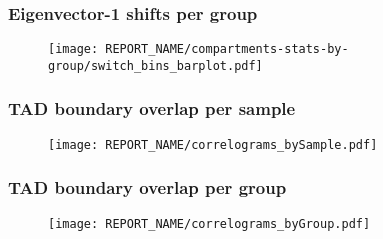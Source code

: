 \begin{frame}												%
\frametitle{Eigenvector-1 shifts per group}								%
\begin{figure}												%
\texttt{[image: REPORT\_NAME/compartments-stats-by-group/switch\_bins\_barplot.pdf]}	%
\end{figure}												%
\end{frame}												%

\begin{frame}												%
\frametitle{TAD boundary overlap per sample}								%
\begin{figure}												%
\centering												%
\texttt{[image: REPORT\_NAME/correlograms\_bySample.pdf]}				%
\end{figure}												%
\end{frame}												%

\begin{frame}												%
\frametitle{TAD boundary overlap per group}								%
\begin{figure}												%
\centering												%
\texttt{[image: REPORT\_NAME/correlograms\_byGroup.pdf]}				%
\end{figure}												%
\end{frame}												%
